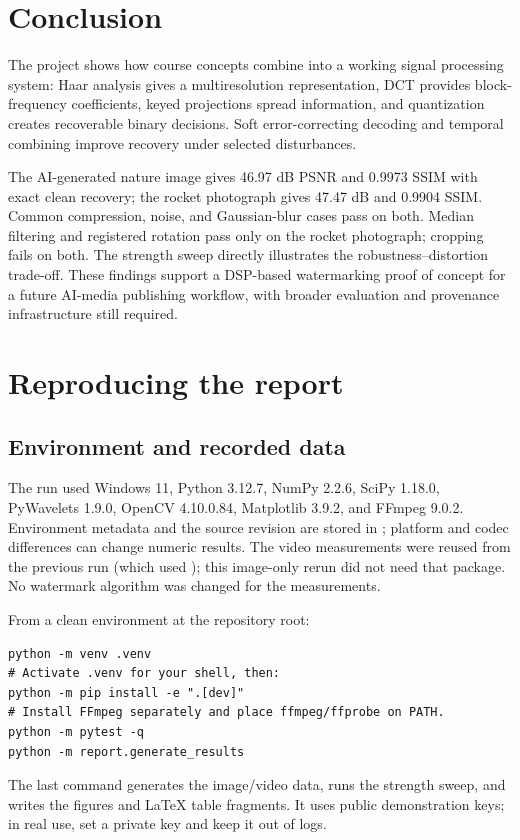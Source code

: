 \documentclass[11pt,a4paper]{article}
\newcommand{\code}[1]{\texttt{\detokenize{#1}}}
\begin{document}
\section{Conclusion}
The project shows how course concepts combine into a working signal processing
system: Haar analysis gives a multiresolution representation, DCT provides
block-frequency coefficients, keyed projections spread information, and
quantization creates recoverable binary decisions. Soft error-correcting decoding
and temporal combining improve recovery under selected disturbances.

The AI-generated nature image gives 46.97 dB PSNR and 0.9973 SSIM with exact clean
recovery; the rocket photograph gives 47.47 dB and 0.9904 SSIM. Common compression,
noise, and Gaussian-blur cases pass on both. Median filtering and registered rotation
pass only on the rocket photograph; cropping fails on both. The strength
sweep directly illustrates the robustness--distortion trade-off. These findings
support a DSP-based watermarking proof of concept for a future AI-media publishing
workflow, with broader evaluation and provenance infrastructure still required.

\appendix
\section{Reproducing the report}
\subsection{Environment and recorded data}
The run used Windows 11, Python 3.12.7, NumPy 2.2.6, SciPy 1.18.0,
PyWavelets 1.9.0, OpenCV 4.10.0.84, Matplotlib 3.9.2, and
FFmpeg 9.0.2. Environment metadata and the source revision are stored in
\code{data/environment.json}; platform and codec differences can change numeric
results. The video measurements were reused from the previous run (which used
\code{ffmpeg-python 0.2.0}); this image-only rerun did not need that package. No
watermark algorithm was changed for the measurements.

From a clean environment at the repository root:
\begin{lstlisting}
python -m venv .venv
# Activate .venv for your shell, then:
python -m pip install -e ".[dev]"
# Install FFmpeg separately and place ffmpeg/ffprobe on PATH.
python -m pytest -q
python -m report.generate_results
\end{lstlisting}
The last command generates the image/video data, runs the strength sweep, and
writes the figures and LaTeX table fragments. It uses public demonstration keys; in
real use, set a private key and keep it out of logs.
\end{document}
